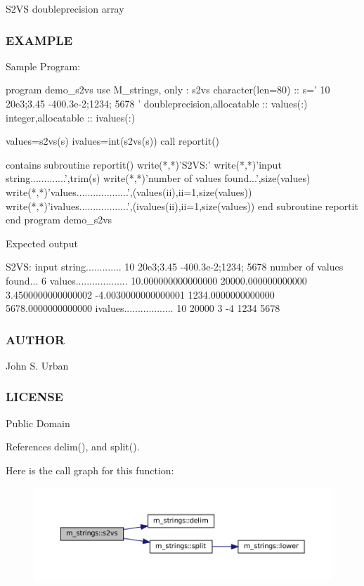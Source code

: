 S2\+VS doubleprecision array

\subsubsection*{E\+X\+A\+M\+P\+LE}

Sample Program\+: \begin{DoxyVerb} program demo_s2vs
 use M_strings, only : s2vs
 character(len=80)           :: s=' 10 20e3;3.45 -400.3e-2;1234; 5678 '
 doubleprecision,allocatable :: values(:)
 integer,allocatable         :: ivalues(:)

 values=s2vs(s)
 ivalues=int(s2vs(s))
 call reportit()

 contains
   subroutine reportit()
     write(*,*)'S2VS:'
     write(*,*)'input string.............',trim(s)
     write(*,*)'number of values found...',size(values)
     write(*,*)'values...................',(values(ii),ii=1,size(values))
     write(*,*)'ivalues..................',(ivalues(ii),ii=1,size(values))
   end subroutine reportit
 end program demo_s2vs
\end{DoxyVerb}


Expected output \begin{DoxyVerb}S2VS:
input string............. 10 20e3;3.45 -400.3e-2;1234; 5678
number of values found... 6
values................... 10.000000000000000  20000.000000000000 3.4500000000000002
-4.0030000000000001       1234.0000000000000  5678.0000000000000
ivalues.................. 10  20000  3  -4 1234 5678
\end{DoxyVerb}
 \subsubsection*{A\+U\+T\+H\+OR}

John S. Urban \subsubsection*{L\+I\+C\+E\+N\+SE}

Public Domain 

References delim(), and split().

Here is the call graph for this function\+:\nopagebreak
\begin{figure}[H]
\begin{center}
\leavevmode
\includegraphics[width=350pt]{namespacem__strings_ad7fffe79559a666aa28e1ed598b8670f_cgraph}
\end{center}
\end{figure}
\mbox{\label{namespacem__strings_a536b90500130aa47bde4def7ecd5f6aa}} 
